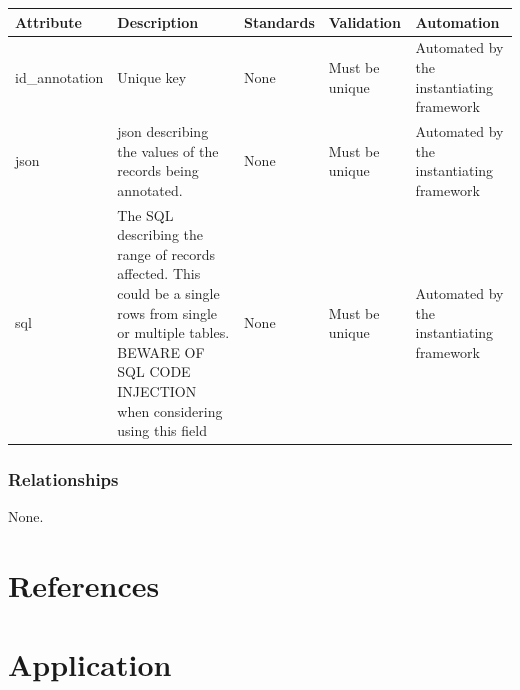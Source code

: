 \begin{longtable}[]{@{}
  >{\raggedright\arraybackslash}p{}
  >{\raggedright\arraybackslash}p{}
  >{\raggedright\arraybackslash}p{}
  >{\raggedright\arraybackslash}p{}
  >{\raggedright\arraybackslash}p{}@{}}
\toprule\noalign{}
\begin{minipage}[b]{\linewidth}\raggedright
Attribute
\end{minipage} & \begin{minipage}[b]{\linewidth}\raggedright
Description
\end{minipage} & \begin{minipage}[b]{\linewidth}\raggedright
Standards
\end{minipage} & \begin{minipage}[b]{\linewidth}\raggedright
Validation
\end{minipage} & \begin{minipage}[b]{\linewidth}\raggedright
Automation
\end{minipage} \\
\midrule\noalign{}
\endhead
\bottomrule\noalign{}
\endlastfoot
id\_annotation & Unique key & None & Must be unique & Automated by the
instantiating framework \\
json & json describing the values of the records being annotated. & None
& Must be unique & Automated by the instantiating framework \\
sql & The SQL describing the range of records affected. This could be a
single rows from single or multiple tables. BEWARE OF SQL CODE INJECTION
when considering using this field & None & Must be unique & Automated by
the instantiating framework \\
\end{longtable}

\subsubsection{Relationships}\label{relationships}

None.

\section{References}\label{references}

\section{Application}\label{application}

